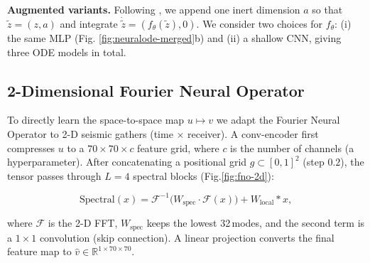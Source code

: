 \documentclass{article}
\begin{document}
\textbf{Augmented variants.}  
Following \citet{anode}, we append one inert
dimension $a$ so that $\tilde z=(z,a)$ and integrate
$\dot{\tilde z}=(f_\theta(\tilde z),0)$.
We consider two choices for $f_\theta$:
(i) the same MLP (Fig. \ref{fig:neuralode-merged}b) and
(ii) a shallow CNN, giving three ODE models in total.

\subsection{2-Dimensional Fourier Neural Operator}

To directly learn the space-to-space map
$u\!\mapsto\!v$ we adapt the Fourier Neural Operator \cite{fno}
to 2-D seismic gathers (time $\times$ receiver).
A conv-encoder first compresses $u$ to a $70\!\times\!70\!\times\!c$ feature grid, where $c$ is the number of channels (a hyperparameter).
After concatenating a positional grid
$g\!\subset\![0,1]^2$ (step $0.2$),
the tensor passes through $L=4$
spectral blocks (Fig.\ref{fig:fno-2d}):

\[
\mathrm{Spectral}(x)=
\mathcal F^{-1}\!\bigl(
  W_{\!\text{spec}}\!\cdot\!\mathcal F(x)
\bigr)+W_{\!\text{local}}*x,
\]

where $\mathcal F$ is the 2-D FFT, 
$W_{\!\text{spec}}$ keeps the lowest 32\,modes,
and the second term is a $1\times1$ convolution (skip connection).
A linear projection converts the final feature map to
$\hat v\in\mathbb R^{1\times70\times70}$.
\end{document}
